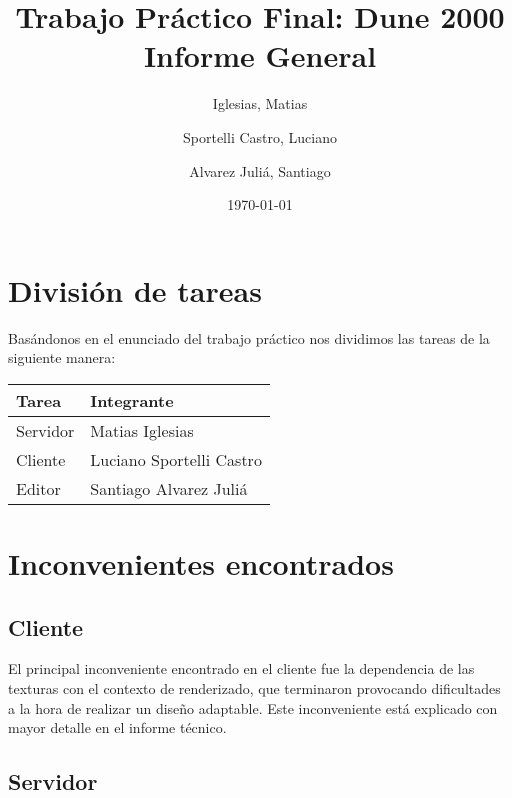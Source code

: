 \documentclass[titlepage,a4paper,12pt]{article}
\title{ Trabajo Práctico Final: Dune 2000 \\
 \large{Informe General}}
\author{Iglesias, Matias \and Sportelli Castro, Luciano \and Alvarez Juliá, Santiago}
\date{ \today }
\begin{document}
\maketitle

\tableofcontents %

\newpage
\section{División de tareas}

Basándonos en el enunciado del trabajo práctico nos dividimos las tareas de la siguiente manera:\\

\begin{center}
    \begin{tabular}{ | l | l |}
    \hline
    Tarea & Integrante \\ \hline
    Servidor & Matias Iglesias  \\ \hline
    Cliente & Luciano Sportelli Castro \\ \hline
    Editor & Santiago Alvarez Juliá \\
    \hline
    \end{tabular}
\end{center}

\section{Inconvenientes encontrados}

\subsection{Cliente}
El principal inconveniente encontrado en el cliente fue la dependencia de las texturas con el contexto de renderizado, que terminaron provocando dificultades a la hora de realizar un diseño adaptable. Este inconveniente está explicado con mayor detalle en el informe técnico.

\subsection{Servidor}
\end{document}
